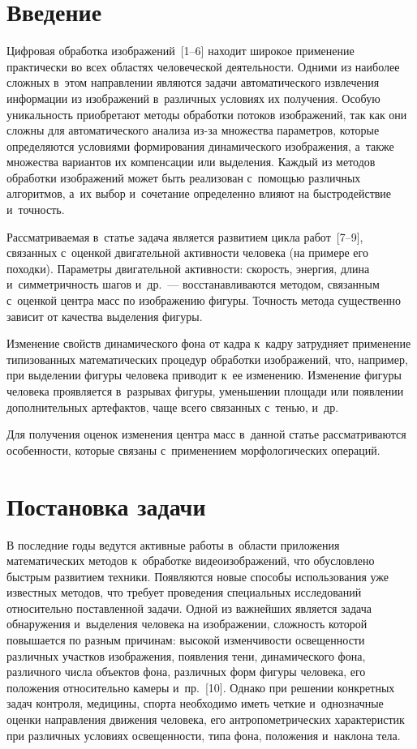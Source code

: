 \begin{multicols}{2}

\label{st\stat}

\section{Введение}

  Цифровая обработка изображений~[1--6] находит широкое применение
практически во всех \mbox{об\-ластях} человеческой деятельности. Одними из наиболее
сложных в~этом направлении являются задачи автоматического извлечения
информации из изображений в~различных условиях их получения. Особую
уникальность приобретают методы обработки потоков изображений, так как
они сложны для автоматического анализа из-за множества параметров, которые
определяются условиями формирования динамического изображения, а~также
множества вариантов их компенсации или выделения. Каждый из методов
обработки изображений может быть реализован с~помощью различных
алгоритмов, а~их выбор и~сочетание определенно влияют на быстродействие и~точность.

  Рассматриваемая в~статье задача является развитием цикла работ~[7--9],
связанных с~оценкой двигательной активности человека (на примере его
походки). Параметры двигательной активности: скорость, энергия, длина и~симметричность шагов и~др.~--- восстанавливаются методом, связанным с~оценкой центра масс по изображению фигуры. Точность метода существенно
зависит от качества выделения фигуры.

  Изменение свойств динамического фона от кад\-ра к~кадру затрудняет
применение типизованных математических процедур обработки изображений,
что, например, при выделении фигуры человека приводит к~ее изменению.
Изменение фигуры человека проявляется в~разрывах фигуры, уменьшении
площади или появлении дополнительных артефактов, чаще всего связанных с~тенью, и~др.

  Для получения оценок изменения центра масс в~данной статье
рассматриваются особенности, которые связаны с~применением
морфологических операций.

\section{Постановка задачи }

  В последние годы ведутся активные работы в~области приложения
математических методов к~обработке видеоизображений, что обусловлено
быст\-рым развитием техники. Появляются новые способы использования уже
известных методов, что требует проведения специальных исследований
относительно поставленной задачи. Одной из важнейших является задача
обнаружения и~выделения человека на изображении, сложность которой
повышается по разным причинам: высокой измен\-чивости освещенности
различных участков изображения, появления тени, динамического фона,
различного числа объектов фона, различных форм фигуры человека, его
положения относительно камеры и~пр.~[10]. Однако при решении конкретных
задач контроля, медицины, спорта необходимо иметь четкие и~однозначные
оценки направления движения человека, его антропометрических
характеристик при различных условиях освещенности, типа фона, положения и~наклона тела.


\end{multicols}
